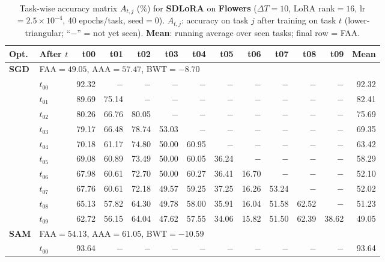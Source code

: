 \begin{table}[ht]
\centering
\caption{%
  Task-wise accuracy matrix $A_{t,j}$ (\%) for \textbf{SDLoRA} on \textbf{Flowers} ($\Delta T=10$, LoRA rank$=16$, lr$=2.5\times10^{-4}$, 40 epochs/task, seed$=0$).
  $A_{t,j}$: accuracy on task $j$ after training on task $t$  (lower-triangular; ``$-$'' = not yet seen).
  \textbf{Mean}: running average over seen tasks; final row = FAA.
}
\label{tab:raw_sdlora_flowers}
\setlength{\tabcolsep}{2.8pt}
\renewcommand{\arraystretch}{0.88}
\scriptsize
\begin{tabular}{@{}l l r r r r r r r r r r r@{}}
\toprule
\textbf{Opt.} & \textbf{After $t$} & \textbf{t00} & \textbf{t01} & \textbf{t02} & \textbf{t03} & \textbf{t04} & \textbf{t05} & \textbf{t06} & \textbf{t07} & \textbf{t08} & \textbf{t09} & \textbf{Mean} \\
\midrule
\multirow{11}{*}{\textbf{SGD}} & \multicolumn{12}{l}{\quad\small FAA$=49.05$,\; AAA$=57.47$,\; BWT$=-8.70$} \\
 & $t_{00}$ & 92.32 & $-$ & $-$ & $-$ & $-$ & $-$ & $-$ & $-$ & $-$ & $-$ & 92.32 \\
 & $t_{01}$ & 89.69 & 75.14 & $-$ & $-$ & $-$ & $-$ & $-$ & $-$ & $-$ & $-$ & 82.41 \\
 & $t_{02}$ & 80.26 & 66.76 & 80.05 & $-$ & $-$ & $-$ & $-$ & $-$ & $-$ & $-$ & 75.69 \\
 & $t_{03}$ & 79.17 & 66.48 & 78.74 & 53.03 & $-$ & $-$ & $-$ & $-$ & $-$ & $-$ & 69.35 \\
 & $t_{04}$ & 70.18 & 61.17 & 74.80 & 50.00 & 60.95 & $-$ & $-$ & $-$ & $-$ & $-$ & 63.42 \\
 & $t_{05}$ & 69.08 & 60.89 & 73.49 & 50.00 & 60.05 & 36.24 & $-$ & $-$ & $-$ & $-$ & 58.29 \\
 & $t_{06}$ & 67.98 & 60.61 & 72.70 & 50.00 & 60.27 & 36.41 & 16.70 & $-$ & $-$ & $-$ & 52.10 \\
 & $t_{07}$ & 67.76 & 60.61 & 72.18 & 49.57 & 59.25 & 37.25 & 16.26 & 53.24 & $-$ & $-$ & 52.02 \\
 & $t_{08}$ & 65.13 & 57.82 & 64.30 & 49.78 & 58.00 & 35.91 & 16.04 & 51.58 & 62.52 & $-$ & 51.23 \\
 & $t_{09}$ & 62.72 & 56.15 & 64.04 & 47.62 & 57.55 & 34.06 & 15.82 & 51.50 & 62.39 & 38.62 & 49.05 \\
\midrule
\multirow{11}{*}{\textbf{SAM}} & \multicolumn{12}{l}{\quad\small FAA$=54.13$,\; AAA$=61.05$,\; BWT$=-10.59$} \\
 & $t_{00}$ & 93.64 & $-$ & $-$ & $-$ & $-$ & $-$ & $-$ & $-$ & $-$ & $-$ & 93.64 \\

\end{tabular}
\end{table}
